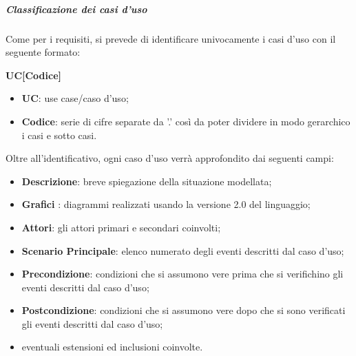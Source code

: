 			\subparagraph{Classificazione dei casi d'uso}
			Come per i requisiti, si prevede di identificare univocamente i casi d'uso con il seguente formato:
			\begin{center}
				\textbf{UC[Codice]}
			\end{center}
			\begin{itemize}
				\item \textbf{UC}: use case/caso d'uso;
				\item \textbf{Codice}: serie di cifre separate da ’.’ così da poter dividere in modo gerarchico i casi e sotto casi.
			\end{itemize}
			Oltre all'identificativo, ogni caso d'uso verrà approfondito dai seguenti campi:
			\begin{itemize}
				\item \textbf{Descrizione}: breve spiegazione della situazione modellata;
				\item \textbf{Grafici }: diagrammi realizzati usando la versione 2.0 del linguaggio;
				\item \textbf{Attori}: gli attori primari e secondari coinvolti;
				\item \textbf{Scenario Principale}: elenco numerato degli eventi descritti dal caso d'uso;
				\item \textbf{Precondizione}: condizioni che si assumono vere prima che si verifichino gli eventi descritti dal caso d'uso;
				\item \textbf{Postcondizione}: condizioni che si assumono vere dopo che si sono verificati gli eventi descritti dal caso d'uso;
				\item eventuali estensioni ed inclusioni coinvolte.
			\end{itemize}

